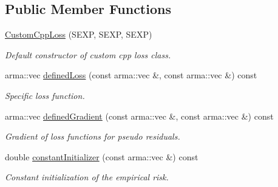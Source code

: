 \subsection*{Public Member Functions}
\begin{DoxyCompactItemize}
\item 
\hyperlink{classloss_1_1_custom_cpp_loss_a0616bfb4c640c63a4307d039b32079d1}{Custom\+Cpp\+Loss} (S\+E\+XP, S\+E\+XP, S\+E\+XP)
\begin{DoxyCompactList}\small\item\em Default constructor of custom cpp loss class. \end{DoxyCompactList}\item 
arma\+::vec \hyperlink{classloss_1_1_custom_cpp_loss_a5611805b67b0542449beb898051ab943}{defined\+Loss} (const arma\+::vec \&, const arma\+::vec \&) const
\begin{DoxyCompactList}\small\item\em Specific loss function. \end{DoxyCompactList}\item 
arma\+::vec \hyperlink{classloss_1_1_custom_cpp_loss_a3ff741b3a4d4c3f3515660dcb7b32781}{defined\+Gradient} (const arma\+::vec \&, const arma\+::vec \&) const
\begin{DoxyCompactList}\small\item\em Gradient of loss functions for pseudo residuals. \end{DoxyCompactList}\item 
double \hyperlink{classloss_1_1_custom_cpp_loss_a7e3691161855a4a3152982274e74c96a}{constant\+Initializer} (const arma\+::vec \&) const
\begin{DoxyCompactList}\small\item\em Constant initialization of the empirical risk. \end{DoxyCompactList}\end{DoxyCompactItemize}
